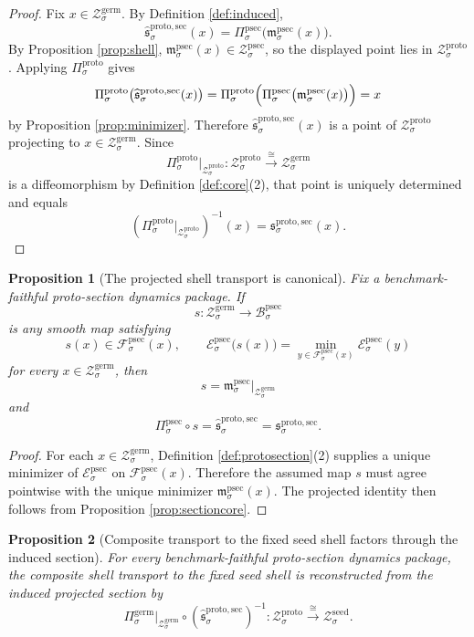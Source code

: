\documentclass[11pt]{article}
\newcommand{\SeedShell}[1]{\mathcal Z_{#1}^{\mathrm{seed}}}
\newcommand{\GermProj}[1]{\Pi_{#1}^{\mathrm{germ}}}
\newcommand{\GermShell}[1]{\mathcal Z_{#1}^{\mathrm{germ}}}
\newcommand{\ProtoProj}[1]{\Pi_{#1}^{\mathrm{proto}}}
\newcommand{\ProtoShell}[1]{\mathcal Z_{#1}^{\mathrm{proto}}}
\newcommand{\ProtoTransportSec}[1]{\mathfrak s_{#1}^{\mathrm{proto,sec}}}
\newcommand{\ProtoSectionBody}[1]{\mathcal B_{#1}^{\mathrm{psec}}}
\newcommand{\ProtoSectionProj}[1]{\Pi_{#1}^{\mathrm{psec}}}
\newcommand{\ProtoSectionFiber}[2]{\mathcal F_{#1}^{\mathrm{psec}}(#2)}
\newcommand{\ProtoSectionFunctional}[1]{\mathscr E_{#1}^{\mathrm{psec}}}
\newcommand{\ProtoSectionShell}[1]{\mathcal Z_{#1}^{\mathrm{psec}}}
\newcommand{\ProtoSectionMin}[1]{\mathfrak m_{#1}^{\mathrm{psec}}}
\newcommand{\InducedTransportSec}[1]{\widehat{\mathfrak s}_{#1}^{\mathrm{proto,sec}}}
\newtheorem{proposition}{Proposition}
\begin{document}
\begin{proof}
Fix \(x\in\GermShell{\sigma}\). By Definition \ref{def:induced},
\[
\InducedTransportSec{\sigma}(x)
=
\ProtoSectionProj{\sigma}\bigl(\ProtoSectionMin{\sigma}(x)\bigr).
\]
By Proposition \ref{prop:shell}, \(\ProtoSectionMin{\sigma}(x)\in\ProtoSectionShell{\sigma}\), so the displayed point lies in \(\ProtoShell{\sigma}\). Applying \(\ProtoProj{\sigma}\) gives
\[
\ProtoProj{\sigma}\bigl(\InducedTransportSec{\sigma}(x)\bigr)
=
\ProtoProj{\sigma}\Bigl(
\ProtoSectionProj{\sigma}\bigl(\ProtoSectionMin{\sigma}(x)\bigr)
\Bigr)
=
x
\]
by Proposition \ref{prop:minimizer}. Therefore \(\InducedTransportSec{\sigma}(x)\) is a point of \(\ProtoShell{\sigma}\) projecting to \(x\in\GermShell{\sigma}\). Since
\[
\ProtoProj{\sigma}\big|_{\ProtoShell{\sigma}}
:
\ProtoShell{\sigma}\xrightarrow{\cong}\GermShell{\sigma}
\]
is a diffeomorphism by Definition \ref{def:core}(2), that point is uniquely determined and equals
\[
\left(
\ProtoProj{\sigma}\big|_{\ProtoShell{\sigma}}
\right)^{-1}(x)
=
\ProtoTransportSec{\sigma}(x).
\]
\end{proof}

\begin{proposition}[The projected shell transport is canonical]
\label{prop:canonical}
Fix a benchmark-faithful proto-section dynamics package. If
\[
s:\GermShell{\sigma}\to\ProtoSectionBody{\sigma}
\]
is any smooth map satisfying
\[
s(x)\in\ProtoSectionFiber{\sigma}{x},
\qquad
\ProtoSectionFunctional{\sigma}\bigl(s(x)\bigr)
=
\min_{y\in\ProtoSectionFiber{\sigma}{x}}
\ProtoSectionFunctional{\sigma}(y)
\]
for every \(x\in\GermShell{\sigma}\), then
\[
s=\ProtoSectionMin{\sigma}\big|_{\GermShell{\sigma}}
\]
and
\[
\ProtoSectionProj{\sigma}\circ s
=
\InducedTransportSec{\sigma}
=
\ProtoTransportSec{\sigma}.
\]
\end{proposition}

\begin{proof}
For each \(x\in\GermShell{\sigma}\), Definition \ref{def:protosection}(2) supplies a unique minimizer of \(\ProtoSectionFunctional{\sigma}\) on \(\ProtoSectionFiber{\sigma}{x}\). Therefore the assumed map \(s\) must agree pointwise with the unique minimizer \(\ProtoSectionMin{\sigma}(x)\). The projected identity then follows from Proposition \ref{prop:sectioncore}.
\end{proof}

\begin{proposition}[Composite transport to the fixed seed shell factors through the induced section]
\label{prop:seedtransport}
For every benchmark-faithful proto-section dynamics package, the composite shell transport to the fixed seed shell is reconstructed from the induced projected section by
\[
\GermProj{\sigma}\big|_{\GermShell{\sigma}}
\circ
\left(\InducedTransportSec{\sigma}\right)^{-1}
:
\ProtoShell{\sigma}\xrightarrow{\cong}\SeedShell{\sigma}.
\]
\end{proposition}
\end{document}
